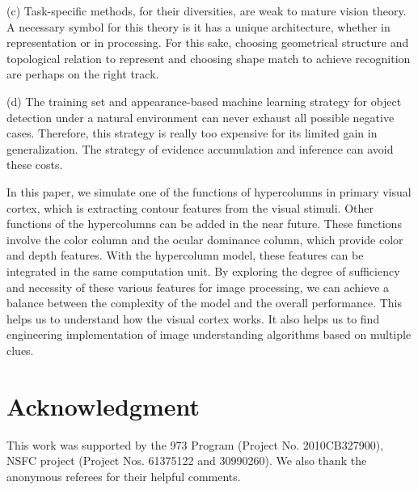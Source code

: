 \documentclass{article}
\begin{document}
(c) Task-specific methods, for their diversities, are weak to mature vision theory. 
A necessary symbol for this theory is it has a unique architecture, whether in representation or in processing. 
For this sake, choosing geometrical structure and topological relation to represent and choosing shape match to achieve recognition are perhaps on the right track.

(d) The training set and appearance-based machine learning strategy for object detection under a natural environment can never exhaust all possible negative cases. Therefore, this strategy is really too expensive for its limited gain in generalization. The strategy of evidence accumulation and inference can avoid these costs.

In this paper, we simulate one of the functions of hypercolumns in primary visual cortex,
which is extracting contour features from the visual stimuli.
Other functions of the hypercolumns can be added in the near future.
These functions involve the color column and the ocular dominance column, which provide color and depth features.
With the hypercolumn model, these features can be integrated in the same computation unit.
By exploring the degree of sufficiency and necessity of these various features for image processing, 
we can achieve a balance between the complexity of the model and the overall performance. 
This helps us to understand how the visual cortex works.
It also helps us to find engineering implementation of image understanding algorithms based on multiple clues.


\section*{Acknowledgment}

This work was supported by the 973 Program (Project No. 2010CB327900), NSFC project (Project Nos. 61375122 and 30990260). We also thank the anonymous referees for their helpful comments.





\end{document}
